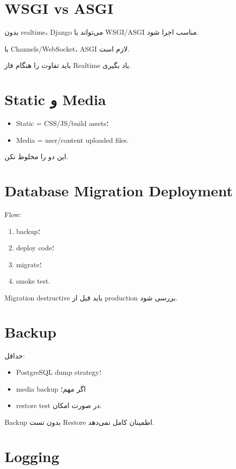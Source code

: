 \section{WSGI vs ASGI}

بدون realtime، Django می‌تواند با WSGI/ASGI مناسب اجرا شود.

با Channels/WebSocket، ASGI لازم است.

باید تفاوت را هنگام فاز Realtime یاد بگیری.

\section{Static و Media}

\begin{itemize}
  \item Static = CSS/JS/build assets؛
  \item Media = user/content uploaded files.
\end{itemize}

این دو را مخلوط نکن.

\section{Database Migration Deployment}

Flow:
\begin{enumerate}
  \item backup؛
  \item deploy code؛
  \item migrate؛
  \item smoke test.
\end{enumerate}

Migration destructive باید قبل از production بررسی شود.

\section{Backup}

حداقل:
\begin{itemize}
  \item PostgreSQL dump strategy؛
  \item media backup اگر مهم؛
  \item restore test در صورت امکان.
\end{itemize}

Backup بدون تست Restore اطمینان کامل نمی‌دهد.

\section{Logging}

